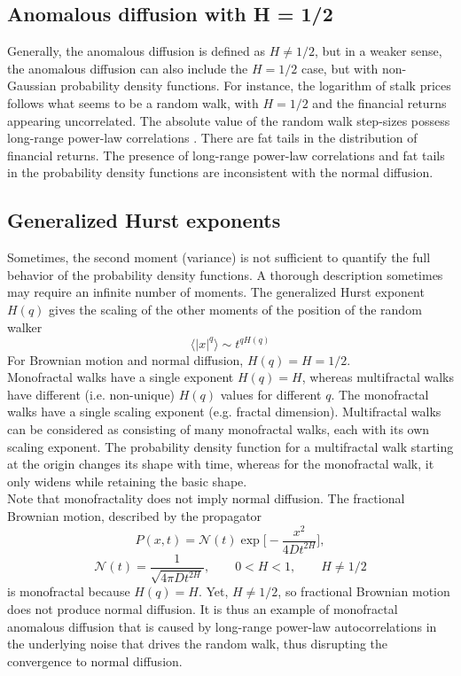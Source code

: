 \documentclass[12pt]{report}
\begin{document}
\begin{justify}
\subsection{Anomalous diffusion with H = 1/2}
Generally, the anomalous diffusion is defined as $H \neq 1/2$, but in a weaker sense, the anomalous diffusion can also include the $H = 1/2$ case, but with non-Gaussian probability density functions. For instance, the logarithm of stalk prices follows what seems to be a random walk, with $H = 1/2$ and the financial returns appearing uncorrelated. The absolute value of the random walk step-sizes possess long-range power-law correlations \cite{selfgenpowerlaw}. There are fat tails in the distribution of financial returns. The presence of long-range power-law correlations and fat tails in the probability density functions are inconsistent with the normal diffusion.

\subsection{Generalized Hurst exponents} 
Sometimes, the second moment (variance) is not sufficient to quantify the full behavior of the probability density functions. A thorough description sometimes may require an infinite number of moments. The generalized Hurst exponent $H(q)$ gives the scaling \cite{criticalscaling} of the other moments of the position of the random walker
\begin{equation}
\langle |x|^q \rangle \sim t ^{q H(q)}
\end{equation}
For Brownian motion and normal diffusion, $H(q) = H = 1/2$.\\

Monofractal walks have a single exponent $H(q) = H$, whereas multifractal walks have different (i.e. non-unique) $H(q)$ values for different $q$. The monofractal walks have a single scaling exponent (e.g. fractal dimension). Multifractal walks can be considered as consisting of many monofractal walks, each with its own scaling exponent. The probability density function for a multifractal walk starting at the origin changes its shape with time, whereas for the monofractal walk, it only widens while retaining the basic shape.\\

Note that monofractality does not imply normal diffusion. The fractional Brownian motion, described by the propagator 
\begin{equation}
P(x,t) = \mathcal{N}(t) \exp\Bigg[ -\frac{x^2}{4Dt^{2H}}\Bigg],
\end{equation}
\begin{equation}
\mathcal{N}(t) = \frac{1}{\sqrt{4 \pi Dt^{2H}}}, \quad \quad 0 < H < 1, \quad \quad H \neq 1/2
\end{equation}
is monofractal because $H(q) = H$. Yet, $H \neq 1/2$, so fractional Brownian motion does not produce normal diffusion. It is thus an example of monofractal anomalous diffusion that is caused by long-range power-law autocorrelations in the underlying noise that drives the random walk, thus disrupting the convergence to normal diffusion.\\


\end{justify}
\end{document}
